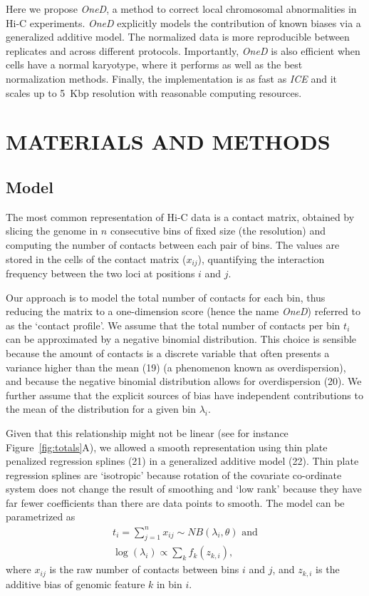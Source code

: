 \documentclass[a4,center,fleqn]{NAR}
\providecommand{\DIFadd}[1]{{\protect\color{red}#1}} %
\providecommand{\DIFdel}[1]{{\protect}}                      %
\providecommand{\DIFaddbegin}{} %
\providecommand{\DIFaddend}{} %
\providecommand{\DIFdelbegin}{} %
\providecommand{\DIFdelend}{} %
\begin{document}
Here we propose \textit{OneD}, a method to correct local chromosomal
abnormalities in Hi-C experiments. \textit{OneD} explicitly models the
contribution of known biases via a generalized additive model. The
normalized data is more reproducible between replicates and across
different protocols. Importantly, \textit{OneD} is also efficient when
cells have a normal karyotype, where it performs as well as the best
normalization methods. Finally, the implementation is as fast as
\textit{ICE} and it scales up to 5~Kbp resolution with reasonable
computing resources.


\section{MATERIALS AND METHODS}

\subsection{Model}

The most common representation of Hi-C data is a contact matrix, obtained
by slicing the genome in $n$ consecutive bins of fixed size (the
resolution) and computing the number of contacts between each pair of
bins. The values are stored in the cells of the contact matrix ($x_{ij}$),
quantifying the interaction \DIFaddbegin \DIFadd{frequency }\DIFaddend between the two loci at positions
$i$ and $j$.

Our approach is to model the total number of contacts for each bin, thus
reducing the matrix to a one-dimension score (hence the name
\textit{OneD}) referred to as the `contact profile'. We assume that the
total number of contacts per bin $t_{i}$ can be approximated by a
negative binomial distribution. This choice is sensible because the amount
of contacts is a discrete variable \DIFaddbegin \DIFadd{that often presents a variance higher
than the mean (19) (a phenomenon known as
overdispersion), }\DIFaddend and because the negative binomial distribution allows
for overdispersion \DIFaddbegin \DIFadd{(20)}\DIFaddend . We further assume that
the explicit sources of bias have independent contributions to the mean
of the distribution for a given bin $\lambda_i$.

Given that this relationship might not be linear (see for instance
Figure~\ref{fig:totals}A), we allowed a smooth representation using thin
plate penalized regression splines (\DIFdelbegin \DIFdel{19}\DIFdelend \DIFaddbegin \DIFadd{21}\DIFaddend ) in a generalized
additive model (\DIFdelbegin \DIFdel{20}\DIFdelend \DIFaddbegin \DIFadd{22}\DIFaddend ). Thin plate regression splines are
`isotropic' because rotation of the covariate co-ordinate system does not
change the result of smoothing and `low rank' because they have far fewer
coefficients than there are data points to smooth. The model can be
parametrized as
\begin{gather*}
t_i = \sum_{j=1}^n{x_{ij}} \sim  NB(\lambda_i, \theta) \text{ and} \\
\log(\lambda_i) \propto \sum_{k}{f_k(z_{k,i})},
\end{gather*}
where $x_{ij}$ is the raw number of contacts between bins $i$ and $j$, and
$z_{k,i}$ is the additive bias of genomic feature $k$ in bin $i$.
\end{document}
